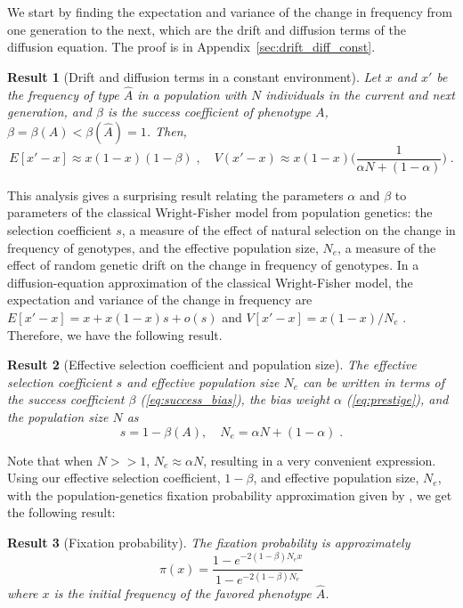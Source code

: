 \documentclass[12pt]{extarticle}
\newtheorem{result}{Result}
\begin{document}
We start by finding the expectation and variance of the change in frequency from one generation to the next, which are the drift and diffusion terms of the diffusion equation.
The proof is in Appendix~\ref{sec:drift_diff_const}.
\\

\begin{result}[Drift and diffusion terms in a constant environment]
Let $x$ and $x'$ be the frequency of type $\hat{A}$ in a population with $N$ individuals in the current and next generation, and  $\beta$ is the success coefficient of phenotype $A$, $\beta = \beta(A) < \beta(\hat{A}) = 1$.
Then,
\begin{equation}
E[x'-x] \approx x(1-x)(1-\beta) \;, 
\quad
V(x'-x) \approx x(1-x)\Big(\frac{1}{\alpha N + (1-\alpha)}\Big) \;.
\end{equation} 
\end{result}


This analysis gives a surprising result relating the parameters $\alpha$ and $\beta$ to parameters of the classical Wright-Fisher model from population genetics:
the selection coefficient $s$, a measure of the effect of natural selection on the change in frequency of genotypes, and the effective population size, $N_e$, a measure of the effect of random genetic drift on the change in frequency of genotypes. 
In a diffusion-equation approximation of the classical Wright-Fisher model, the expectation and variance of the change in frequency are $E[x'-x]=x+x(1-x)s+o(s)$ and $V[x'-x]=x(1-x)/N_e$ \citep[eq.~7]{kimura}. 
Therefore, we have the following result.\\

\begin{result}[Effective selection coefficient and population size]\label{res:selection_coef}
The effective selection coefficient $s$ and effective population size $N_e$ can be written in terms of the success coefficient $\beta$ (\cref{eq:success_bias}), the bias weight $\alpha$ (\cref{eq:prestige}), and the population size $N$ as 
\begin{equation}
s=1-\beta(A), \quad N_e=\alpha N + (1-\alpha) \;.
\end{equation}
\end{result}

Note that when $N>>1$, $N_e \approx \alpha N$, resulting in a very convenient expression.\\

Using our effective selection coefficient, $1-\beta$, and effective population size, $N_e$, with the population-genetics fixation probability approximation given by \citet[eq.~8]{kimura}, we get the following result:
\begin{result}[Fixation probability]
The fixation probability is approximately
\begin{equation}\label{eq:kimura_p}
\pi(x) = \frac{1-e^{-2(1-\beta)N_e x}}{1-e^{-2(1-\beta)N_e}}
\end{equation}
where $x$ is the initial frequency of the favored phenotype $\hat{A}$.
\end{result}
\end{document}
